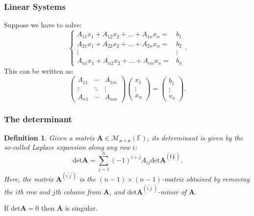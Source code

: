 \documentclass{article}
\newtheorem{definition}{Definition}
\begin{document}
\subsubsection{Linear Systems}
Suppose we have to solve:
\begin{equation}
    \begin{cases}
        A_{11}x_1 + A_{12}x_2 + \ldots + A_{1n}x_n = & b_1 \\
        A_{21}x_1 + A_{22}x_2 + \ldots + A_{2n}x_n = & b_2 \\
        \vdots & \vdots \\
        A_{n1}x_1 + A_{n2}x_2 + \ldots + A_{nn}x_n = & b_n
    \end{cases}.
\end{equation}
This can be written as:
\begin{equation}
    \begin{pmatrix} A_{11} & \cdots & A_{1m} \\
        \vdots & \ddots & \vdots \\
        A_{n1} & \cdots & A_{nm}
    \end{pmatrix}\begin{pmatrix}
        x_1 \\ \vdots \\ x_n
    \end{pmatrix} = \begin{pmatrix}
        b_1 \\ \vdots \\ v_n
    \end{pmatrix}.
\end{equation}


\subsubsection{The determinant}
\begin{definition}
    Given a matrix $\mathbf{A}\in\mathcal{M_{n\times n}}(\mathbb{F})$, its determinant is given by the so-called Laplace expansion along any row $i$:
    \begin{equation}
        \text{det}\mathbf{A} = \sum_{j=1}^n (-1)^{i+j}A_{ij}\text{det}\mathbf{A^{(i^\prime j^\prime)}}.
    \end{equation}
    Here, the matrix $\mathbf{A}^{(i^\prime j^\prime)}$ is the $(n-1)\times(n-1)$-matrix obtained by removing the $i$th row and $j$th column from $\mathbf{A}$, and $\text{det}\mathbf{A}^{(i^\prime j^\prime)}$-minor of $\mathbf{A}$.
\end{definition}
If $\text{det}\mathbf{A} = 0$ then $\mathbf{A}$ is singular.
\end{document}
